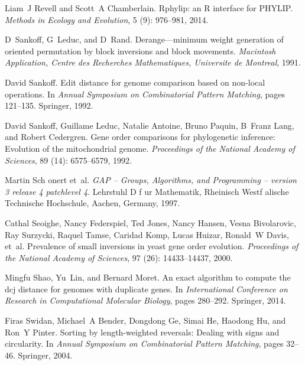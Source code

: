 \documentclass[12pt,a4paper]{amsart}
\numberwithin{equation}{section}
\begin{document}
\begin{thebibliography}{38}
Liam~J Revell and Scott~A Chamberlain.
\newblock Rphylip: an {R} interface for {PHYLIP}.
\newblock \emph{Methods in Ecology and Evolution}, 5 (9):
  976--981, 2014.

D~Sankoff, G~Leduc, and D~Rand.
\newblock Derange---minimum weight generation of oriented permutation by block
  inversions and block movements.
\newblock \emph{Macintosh Application, Centre des Recherches Mathematiques,
  Universite de Montreal}, 1991.

David Sankoff.
\newblock Edit distance for genome comparison based on non-local operations.
\newblock In \emph{Annual Symposium on Combinatorial Pattern Matching}, pages
  121--135. Springer, 1992.

David Sankoff, Guillame Leduc, Natalie Antoine, Bruno Paquin, B~Franz Lang, and
  Robert Cedergren.
\newblock Gene order comparisons for phylogenetic inference: {E}volution of the
  mitochondrial genome.
\newblock \emph{Proceedings of the National Academy of Sciences}, 89
  (14): 6575--6579, 1992.

Martin Sch{ o}nert et~al.
\newblock \emph{{GAP} -- {Groups}, {Algorithms}, and {Programming} -- version 3
  release 4 patchlevel 4}.
\newblock Lehrstuhl D f{ u}r Mathematik, Rheinisch Westf{
  a}lische Technische Hoch\-schule, Aachen, Germany, 1997.

Cathal Seoighe, Nancy Federspiel, Ted Jones, Nancy Hansen, Vesna Bivolarovic,
  Ray Surzycki, Raquel Tamse, Caridad Komp, Lucas Huizar, Ronald~W Davis,
  et~al.
\newblock Prevalence of small inversions in yeast gene order evolution.
\newblock \emph{Proceedings of the National Academy of Sciences}, 97
  (26): 14433--14437, 2000.

Mingfu Shao, Yu~Lin, and Bernard Moret.
\newblock An exact algorithm to compute the dcj distance for genomes with
  duplicate genes.
\newblock In \emph{International Conference on Research in Computational
  Molecular Biology}, pages 280--292. Springer, 2014.

Firas Swidan, Michael~A Bender, Dongdong Ge, Simai He, Haodong Hu, and Ron~Y
  Pinter.
\newblock Sorting by length-weighted reversals: Dealing with signs and
  circularity.
\newblock In \emph{Annual Symposium on Combinatorial Pattern Matching}, pages
  32--46. Springer, 2004.


\end{thebibliography}
\end{document}
